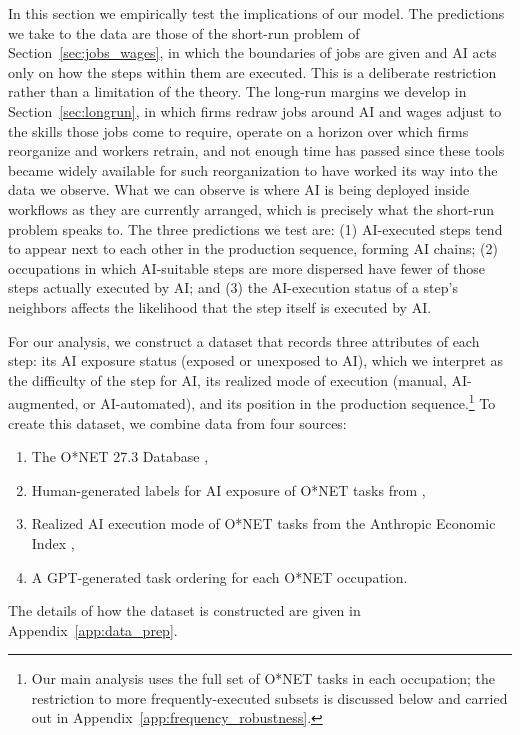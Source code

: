 In this section we empirically test the implications of our model.
The predictions we take to the data are those of the short-run problem of Section~\ref{sec:jobs_wages}, in which the boundaries of jobs are given and AI acts only on how the steps within them are executed.
This is a deliberate restriction rather than a limitation of the theory.
The long-run margins we develop in Section~\ref{sec:longrun}, in which firms redraw jobs around AI and wages adjust to the skills those jobs come to require, operate on a horizon over which firms reorganize and workers retrain, and not enough time has passed since these tools became widely available for such reorganization to have worked its way into the data we observe.
What we can observe is where AI is being deployed inside workflows as they are currently arranged, which is precisely what the short-run problem speaks to.
The three predictions we test are: (1) AI-executed steps tend to appear next to each other in the production sequence, forming AI chains; (2) occupations in which AI-suitable steps are more dispersed have fewer of those steps actually executed by AI; and (3) the AI-execution status of a step's neighbors affects the likelihood that the step itself is executed by AI.

For our analysis, we construct a dataset that records three attributes of each step: its AI exposure status (exposed or unexposed to AI), which we interpret as the difficulty of the step for AI, its realized mode of execution (manual, AI-augmented, or AI-automated), and its position in the production sequence.\footnote{
Our main analysis uses the full set of O*NET tasks in each occupation; the restriction to more frequently-executed subsets is discussed below and carried out in Appendix~\ref{app:frequency_robustness}.
}
To create this dataset, we combine data from four sources:
\begin{enumerate}
    \item The O*NET 27.3 Database \citep{onet27_3},
    \item Human-generated labels for AI exposure of O*NET tasks from \cite{eloundou2023gpts},
    \item Realized AI execution mode of O*NET tasks from the Anthropic Economic Index \citep{handa2025economictasksperformedai},
    \item A GPT-generated task ordering for each O*NET occupation.
\end{enumerate}
The details of how the dataset is constructed are given in Appendix~\ref{app:data_prep}.

